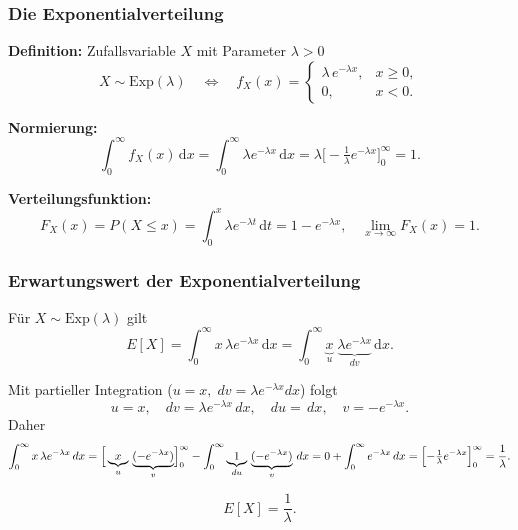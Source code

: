 \documentclass{beamer}
\begin{document}
\begin{frame}
    \frametitle{Die Exponentialverteilung}
{\small

    \textbf{Definition:} Zufallsvariable $X$ mit Parameter $\lambda>0$  
\[
    X \sim \mathrm{Exp}(\lambda)
    \quad\Longleftrightarrow\quad
    f_X(x) = 
        \begin{cases}
            \lambda\,e^{-\lambda x}, & x\ge0,\\
            0, & x<0.
        \end{cases}
\]

\smallskip
  \textbf{Normierung:}
\[
    \int_{0}^{\infty} f_X(x)\,\mathrm{d}x
    = \int_{0}^{\infty} \lambda e^{-\lambda x}\,\mathrm{d}x
    = \lambda\bigl[-\tfrac{1}{\lambda}e^{-\lambda x}\bigr]_{0}^{\infty}
    = 1.
\]

\smallskip
\textbf{Verteilungsfunktion:}
\[
    F_X(x) = P(X\le x)
    = \int_{0}^{x} \lambda e^{-\lambda t}\,\mathrm{d}t
    = 1 - e^{-\lambda x},
    \quad \lim_{x\to\infty}F_X(x)=1.
    \]
}
  \bigskip
  \begin{center}
  \end{center}
\end{frame}

\begin{frame}
  \frametitle{Erwartungswert der Exponentialverteilung}

  Für \(X\sim\mathrm{Exp}(\lambda)\) gilt
  \[
    E[X]
    = \int_{0}^{\infty} x\,\lambda e^{-\lambda x}\,\mathrm{d}x
    = \int_{0}^{\infty}
      \underbrace{x}_{u}
      \;\underbrace{\lambda e^{-\lambda x}}_{dv}
      \,\mathrm{d}x.
  \]

  Mit partieller Integration (\(u=x,\;dv=\lambda e^{-\lambda x}dx\)) folgt
  \[
    u = x,\quad
    dv = \lambda e^{-\lambda x}\,dx,
    \quad
    du = \,dx,\quad
    v = -e^{-\lambda x}.
  \]
  Daher
  \[
    \int_{0}^{\infty} x\,\lambda e^{-\lambda x}\,dx
    = \Bigl[\,\underbrace{x}_{u}\,\underbrace{(-e^{-\lambda x})}_{v}\Bigr]_{0}^{\infty}
      - \int_{0}^{\infty}
        \underbrace{1}_{du}
        \,\underbrace{(-e^{-\lambda x})}_{v}
      \,dx
    = 0 + \int_{0}^{\infty} e^{-\lambda x}\,dx
    = \Bigl[-\tfrac{1}{\lambda}e^{-\lambda x}\Bigr]_{0}^{\infty}
    = \frac{1}{\lambda}.
  \]

  \vfill
  \[
    \boxed{E[X] = \frac{1}{\lambda}.}
  \]
\end{frame}
\end{document}
